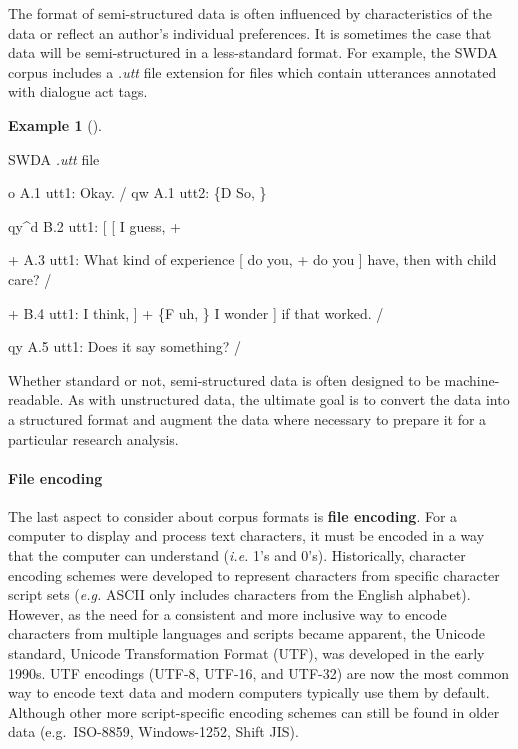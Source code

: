 \documentclass[
  letterpaper,
  DIV=11,
  numbers=noendperiod]{scrreport}
\let\oldparagraph\paragraph
\renewcommand{\paragraph}[1]{\oldparagraph{#1}\mbox{}}
\newenvironment{Shaded}{\begin{snugshade}}{\end{snugshade}}
\newcommand{\NormalTok}[1]{\textcolor[rgb]{0.00,0.00,0.00}{#1}}
\theoremstyle{definition}
\newtheorem{example}{Example}[chapter]
\theoremstyle{remark}
\begin{document}
The format of semi-structured data is often influenced by
characteristics of the data or reflect an author's individual
preferences. It is sometimes the case that data will be semi-structured
in a less-standard format. For example, the SWDA corpus includes a
\emph{.utt} file extension for files which contain utterances annotated
with dialogue act tags.

\begin{example}[]\protect\hypertarget{exm-swda-utt}{}\label{exm-swda-utt}

SWDA \emph{.utt} file

\begin{Shaded}
\begin{Highlighting}[]
\NormalTok{o          A.1 utt1: Okay.  /}
\NormalTok{qw          A.1 utt2: \{D So, \}}

\NormalTok{qy\^{}d          B.2 utt1: [ [ I guess, +}

\NormalTok{+          A.3 utt1: What kind of experience [ do you, + do you ] have, then with child care? /}

\NormalTok{+          B.4 utt1: I think, ] + \{F uh, \} I wonder ] if that worked. /}

\NormalTok{qy          A.5 utt1: Does it say something? /}
\end{Highlighting}
\end{Shaded}

\end{example}

Whether standard or not, semi-structured data is often designed to be
machine-readable. As with unstructured data, the ultimate goal is to
convert the data into a structured format and augment the data where
necessary to prepare it for a particular research analysis.

\hypertarget{file-encoding}{%
\paragraph{File encoding}\label{file-encoding}}

The last aspect to consider about corpus formats is \textbf{file
encoding}. For a computer to display and process text characters, it
must be encoded in a way that the computer can understand (\emph{i.e.}
1's and 0's). Historically, character encoding schemes were developed to
represent characters from specific character script sets (\emph{e.g.}
ASCII only includes characters from the English alphabet). However, as
the need for a consistent and more inclusive way to encode characters
from multiple languages and scripts became apparent, the Unicode
standard, Unicode Transformation Format (UTF), was developed in the
early 1990s. UTF encodings (UTF-8, UTF-16, and UTF-32) are now the most
common way to encode text data and modern computers typically use them
by default. Although other more script-specific encoding schemes can
still be found in older data (e.g.~ISO-8859, Windows-1252, Shift JIS).
\end{document}
